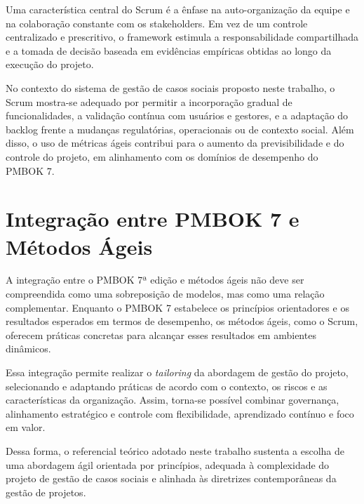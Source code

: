 Uma característica central do Scrum é a ênfase na auto-organização da equipe e na colaboração constante com os stakeholders. Em vez de um controle centralizado e prescritivo, o framework estimula a responsabilidade compartilhada e a tomada de decisão baseada em evidências empíricas obtidas ao longo da execução do projeto.

No contexto do sistema de gestão de casos sociais proposto neste trabalho, o Scrum mostra-se adequado por permitir a incorporação gradual de funcionalidades, a validação contínua com usuários e gestores, e a adaptação do backlog frente a mudanças regulatórias, operacionais ou de contexto social. Além disso, o uso de métricas ágeis contribui para o aumento da previsibilidade e do controle do projeto, em alinhamento com os domínios de desempenho do PMBOK 7.

\section{Integração entre PMBOK 7 e Métodos Ágeis}

A integração entre o PMBOK 7ª edição e métodos ágeis não deve ser compreendida como uma sobreposição de modelos, mas como uma relação complementar. Enquanto o PMBOK 7 estabelece os princípios orientadores e os resultados esperados em termos de desempenho, os métodos ágeis, como o Scrum, oferecem práticas concretas para alcançar esses resultados em ambientes dinâmicos.

Essa integração permite realizar o \textit{tailoring} da abordagem de gestão do projeto, selecionando e adaptando práticas de acordo com o contexto, os riscos e as características da organização. Assim, torna-se possível combinar governança, alinhamento estratégico e controle com flexibilidade, aprendizado contínuo e foco em valor.

Dessa forma, o referencial teórico adotado neste trabalho sustenta a escolha de uma abordagem ágil orientada por princípios, adequada à complexidade do projeto de gestão de casos sociais e alinhada às diretrizes contemporâneas da gestão de projetos.

